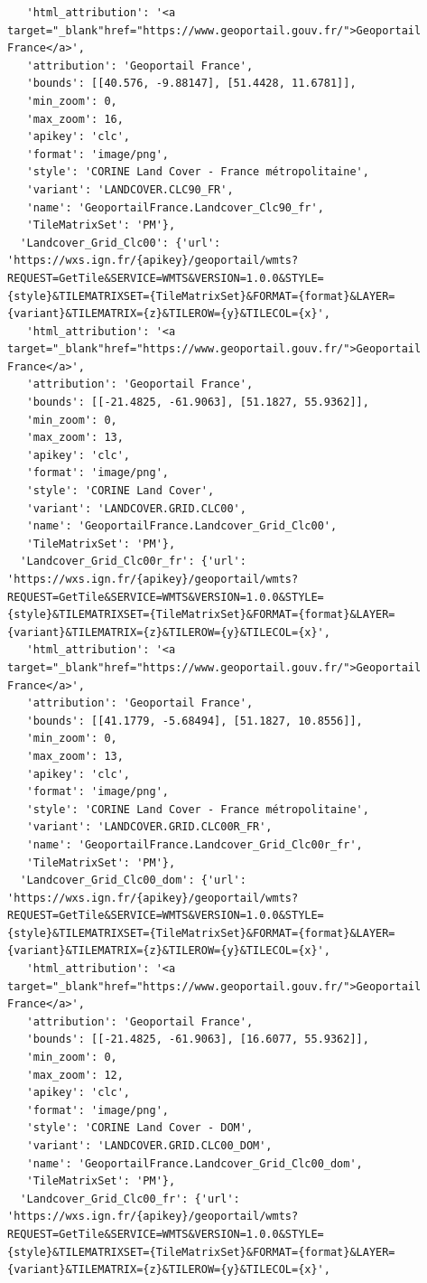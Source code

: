 \documentclass[
  letterpaper,
  DIV=11,
  numbers=noendperiod]{scrreprt}
\begin{document}
\begin{verbatim}
   'html_attribution': '<a target="_blank"href="https://www.geoportail.gouv.fr/">Geoportail France</a>',
   'attribution': 'Geoportail France',
   'bounds': [[40.576, -9.88147], [51.4428, 11.6781]],
   'min_zoom': 0,
   'max_zoom': 16,
   'apikey': 'clc',
   'format': 'image/png',
   'style': 'CORINE Land Cover - France métropolitaine',
   'variant': 'LANDCOVER.CLC90_FR',
   'name': 'GeoportailFrance.Landcover_Clc90_fr',
   'TileMatrixSet': 'PM'},
  'Landcover_Grid_Clc00': {'url': 'https://wxs.ign.fr/{apikey}/geoportail/wmts?REQUEST=GetTile&SERVICE=WMTS&VERSION=1.0.0&STYLE={style}&TILEMATRIXSET={TileMatrixSet}&FORMAT={format}&LAYER={variant}&TILEMATRIX={z}&TILEROW={y}&TILECOL={x}',
   'html_attribution': '<a target="_blank"href="https://www.geoportail.gouv.fr/">Geoportail France</a>',
   'attribution': 'Geoportail France',
   'bounds': [[-21.4825, -61.9063], [51.1827, 55.9362]],
   'min_zoom': 0,
   'max_zoom': 13,
   'apikey': 'clc',
   'format': 'image/png',
   'style': 'CORINE Land Cover',
   'variant': 'LANDCOVER.GRID.CLC00',
   'name': 'GeoportailFrance.Landcover_Grid_Clc00',
   'TileMatrixSet': 'PM'},
  'Landcover_Grid_Clc00r_fr': {'url': 'https://wxs.ign.fr/{apikey}/geoportail/wmts?REQUEST=GetTile&SERVICE=WMTS&VERSION=1.0.0&STYLE={style}&TILEMATRIXSET={TileMatrixSet}&FORMAT={format}&LAYER={variant}&TILEMATRIX={z}&TILEROW={y}&TILECOL={x}',
   'html_attribution': '<a target="_blank"href="https://www.geoportail.gouv.fr/">Geoportail France</a>',
   'attribution': 'Geoportail France',
   'bounds': [[41.1779, -5.68494], [51.1827, 10.8556]],
   'min_zoom': 0,
   'max_zoom': 13,
   'apikey': 'clc',
   'format': 'image/png',
   'style': 'CORINE Land Cover - France métropolitaine',
   'variant': 'LANDCOVER.GRID.CLC00R_FR',
   'name': 'GeoportailFrance.Landcover_Grid_Clc00r_fr',
   'TileMatrixSet': 'PM'},
  'Landcover_Grid_Clc00_dom': {'url': 'https://wxs.ign.fr/{apikey}/geoportail/wmts?REQUEST=GetTile&SERVICE=WMTS&VERSION=1.0.0&STYLE={style}&TILEMATRIXSET={TileMatrixSet}&FORMAT={format}&LAYER={variant}&TILEMATRIX={z}&TILEROW={y}&TILECOL={x}',
   'html_attribution': '<a target="_blank"href="https://www.geoportail.gouv.fr/">Geoportail France</a>',
   'attribution': 'Geoportail France',
   'bounds': [[-21.4825, -61.9063], [16.6077, 55.9362]],
   'min_zoom': 0,
   'max_zoom': 12,
   'apikey': 'clc',
   'format': 'image/png',
   'style': 'CORINE Land Cover - DOM',
   'variant': 'LANDCOVER.GRID.CLC00_DOM',
   'name': 'GeoportailFrance.Landcover_Grid_Clc00_dom',
   'TileMatrixSet': 'PM'},
  'Landcover_Grid_Clc00_fr': {'url': 'https://wxs.ign.fr/{apikey}/geoportail/wmts?REQUEST=GetTile&SERVICE=WMTS&VERSION=1.0.0&STYLE={style}&TILEMATRIXSET={TileMatrixSet}&FORMAT={format}&LAYER={variant}&TILEMATRIX={z}&TILEROW={y}&TILECOL={x}',

\end{verbatim}
\end{document}
